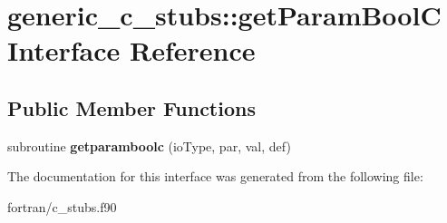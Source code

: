 \hypertarget{interfacegeneric__c__stubs_1_1get_param_bool_c}{}\section{generic\+\_\+c\+\_\+stubs\+:\+:get\+Param\+BoolC Interface Reference}
\label{interfacegeneric__c__stubs_1_1get_param_bool_c}
\subsection*{Public Member Functions}
\begin{DoxyCompactItemize}
\item 
\mbox{\label{interfacegeneric__c__stubs_1_1get_param_bool_c_a23683161b2348d779d7b3857f989717c}} 
subroutine {\bfseries getparamboolc} (io\+Type, par, val, def)
\end{DoxyCompactItemize}


The documentation for this interface was generated from the following file\+:\begin{DoxyCompactItemize}
\item 
fortran/c\+\_\+stubs.\+f90\end{DoxyCompactItemize}
